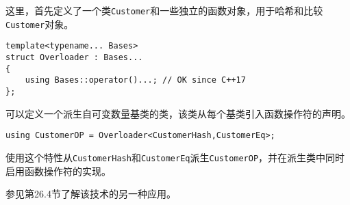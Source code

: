 这里，首先定义了一个类\texttt{Customer}和一些独立的函数对象，用于哈希和比较\texttt{Customer}对象。

\begin{lstlisting}[style=styleCXX]
template<typename... Bases>
struct Overloader : Bases...
{
	using Bases::operator()...; // OK since C++17
};
\end{lstlisting}

可以定义一个派生自可变数量基类的类，该类从每个基类引入函数操作符的声明。

\begin{lstlisting}[style=styleCXX]
using CustomerOP = Overloader<CustomerHash,CustomerEq>;
\end{lstlisting}

使用这个特性从\texttt{CustomerHash}和\texttt{CustomerEq}派生\texttt{CustomerOP}，并在派生类中同时启用函数操作符的实现。

参见第26.4节了解该技术的另一种应用。



























